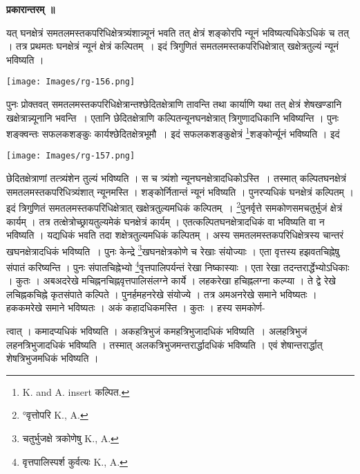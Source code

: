 \documentclass[11pt, openany]{book}
\begin{document}
\begin{center}
\textbf{\large प्रकारान्तरम् ॥ }
\end{center}
\vspace{5mm}

यत् घनक्षेत्रं समतलमस्तकपरिधिक्षेत्रत्र्यंशान्न्यूनं भवति तत् क्षेत्रं शङ्कोरपि न्यूनं भविष्यत्यधिकेऽधिकं च तत् । तत्र प्रथमतः घनक्षेत्रं न्यूनं क्षेत्रं कल्पितम्~। इदं त्रिगुणितं
समतलमस्तकपरिधिक्षेत्रात् खक्षेत्रतुल्यं न्यूनं भविष्यति । \\

\begin{center}
\texttt{[image: Images/rg-156.png]}  
\end{center}

\newpage
पुनः प्रोक्तवत् समतलमस्तकपरिधिक्षेत्रान्तश्छेदितक्षेत्राणि तावन्ति तथा कार्याणि यथा तत् क्षेत्रं शेषखण्डानि खक्षेत्रान्न्यूनानि भवन्ति~। एतानि छेदितक्षेत्राणि कल्पितन्यूनघनक्षेत्रात् त्रिगुणादधिकानि भविष्यन्ति । पुनः शङ्क्वन्तः सफलकशङ्कुः कार्यश्छेदितक्षेत्रभूमौ~। इदं सफलकशङ्कुक्षेत्रं \renewcommand{\thefootnote}{१}\footnote{{\en K. and A. insert} कल्पित.}शङ्कोर्न्यूनं भविष्यति । इदं 
\begin{center}
\noindent\texttt{[image: Images/rg-157.png]}  
\end{center}
छेदितक्षेत्राणां तत्त्र्यंशेन तुल्यं भविष्यति ।
स च त्र्यंशो न्यूनघनक्षेत्रादधिकोऽस्ति~। तस्मात् कल्पितघनक्षेत्रं समतलमस्तकपरिधित्र्यंशात् न्यूनमस्ति । शङ्कोर्नितान्तं न्यूनं भविष्यति । पुनरप्यधिकं घनक्षेत्रं कल्पितम् । इदं त्रिगुणितं समतलमस्तकपरिधिक्षेत्रात् खक्षेत्रतुल्यमधिकं कल्पितम्~। \renewcommand{\thefootnote}{२}\footnote{°वृत्तोपरि {\en K., A.} }पुनर्वृत्ते समकोणसमचतुर्भुजं क्षेत्रं कार्यम् । तत्र तत्क्षेत्रोच्छ्रायतुल्यमेकं घनक्षेत्रं कार्यम् । एतत्कल्पितघनक्षेत्रादधिकं वा भविष्यति वा न भविष्यति । यद्यधिकं भवति तदा शक्षेत्रतुल्यमधिकं कल्पितम् । अस्य समतलमस्तकपरिधिक्षेत्रस्य चान्तरं खघनक्षेत्रादधिकं भविष्यति~। पुनः केन्द्रे \renewcommand{\thefootnote}{३}\footnote{चतुर्भुजक्षे त्रकोणेषु {\en K., A.}}खघनक्षेत्रकोणे च रेखाः संयोज्याः । एता वृत्तस्य हझवतचिह्नेषु संपातं करिष्यन्ति । पुनः संपातचिह्नेभ्यो \renewcommand{\thefootnote}{४}\footnote{वृत्तपालिस्पर्श कुर्वत्यः {\en K., A.}}वृत्तपालिपर्यन्तं रेखा निष्कास्याः । एता रेखा तदन्तरार्द्धेभ्योऽधिकाः । कुतः । अबअदरेखे मचिह्ननचिह्नवृत्तपालिसंलग्ने कार्ये । लहकरेखा हचिह्नलग्ना कल्प्या । ते द्वे रेखे लचिह्नकचिह्ने कृतसंपाते कल्पिते । पुनर्हमहनरेखे संयोज्ये । तत्र अमअनरेखे समाने भविष्यतः । हककमरेखे समाने भविष्यतः । अकं कहादधिकमस्ति । कुतः । हस्य समकोर्ण-

\newpage
\noindent त्वात् । कमादप्यधिकं भविष्यति । अकहत्रिभुजं कमहत्रिभुजादधिकं भविष्यति~। अलहत्रिभुजं लहनत्रिभुजादधिकं भविष्यति । तस्मात् अलकत्रिभुजमन्तरार्द्धादधिकं भविष्यति । एवं शेषान्तरार्द्धात् शेषत्रिभुजमधिकं भविष्यति । \\
\vspace{3mm}
\end{document}
